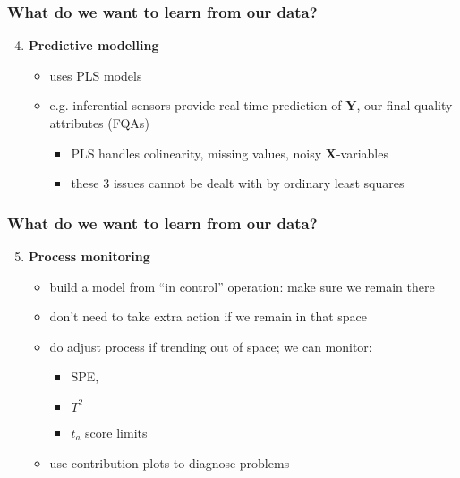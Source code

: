 \begin{frame}\frametitle{What do we want to learn from our data?}

\begin{enumerate}
	\setcounter{enumi}{3}
	
	\item {\bf \color{myGreen}Predictive modelling} 
	
	\begin{itemize}
		\item 	uses PLS models
		
		\item 	e.g. inferential sensors provide real-time prediction of \( \mathbf{Y} \), our final quality attributes (FQAs)
		\begin{itemize}
			\item 	PLS handles colinearity, missing values, noisy \( \mathbf{X} \)-variables
			\item 	these 3 issues cannot be dealt with by ordinary least squares
		\end{itemize}
	\end{itemize}	
\end{enumerate}
\end{frame}

\begin{frame}\frametitle{What do we want to learn from our data?}

\begin{enumerate}
	\setcounter{enumi}{4}
	\item {\bf \color{myGreen}Process monitoring} 
	
	\begin{itemize}
		
		\item 	build a model from ``in control'' operation: make sure we remain there
		
		\item 	don't need to take extra action if we remain in that space
		
		\item 	do adjust process if trending out of space; we can monitor: 
		
		\begin{itemize}
			\item 	SPE, 
			
			\item	\( T^2 \)
			
			\item	\( t_a \) score limits 
			
		\end{itemize}
		
		\item 	use contribution plots to diagnose problems
	\end{itemize}	
\end{enumerate}
\end{frame}

